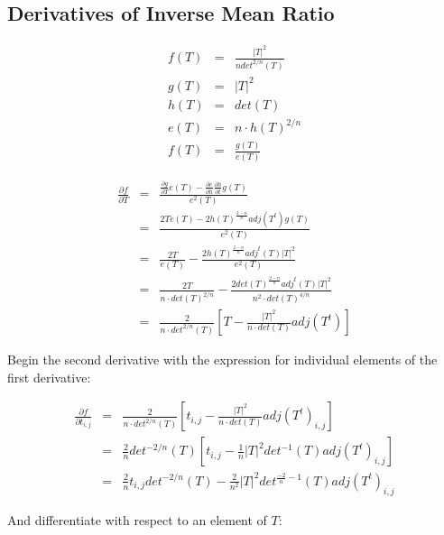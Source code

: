 \documentclass{report}
\begin{document}
\subsection{Derivatives of Inverse Mean Ratio}

\begin{eqnarray}
f(T) & = & \frac{|T|^2}{n det^{2/n}(T)} \\
g(T) & = & |T|^2 \\
h(T) & = & det(T) \\
e(T) & = & n \cdot h(T)^{2/n} \\
f(T) & = & \frac{g(T)}{e(T)} 
\end{eqnarray}

\begin{eqnarray}
\frac{\partial f}{\partial T} &=& \frac{
\frac{\partial g}{\partial T} e(T) - 
\frac{\partial e}{\partial h} \frac{\partial h}{\partial t} g(T)}
{e^2(T)} \\
&=& 
\frac{2 T e(T) - 
2 h(T)^\frac{2-n}{n} adj(T^t) g(T)}
{e^2(T)} \\
& = &  
\frac{2 T}{e(T)} -
\frac{2 h(T)^{\frac{2-n}{n}} adj^t(T) |T|^2}{e^2(T)} \\
& = &  
\frac{2 T}{n \cdot det(T)^{2/n}} -
\frac{2 det(T)^{\frac{2-n}{n}} adj^t(T) |T|^2}{n^2 \cdot det(T)^{4/n}} \\
& = &  
\frac{2}{n \cdot det^{2/n}(T)}\left[ T - \frac{|T|^2}{n \cdot det(T)} adj(T^t) \right]
\end{eqnarray}

\noindent Begin the second derivative with the  expression for individual elements of the first derivative:

\begin{eqnarray}
\frac{\partial f}{\partial t_{i,j}} & = & 
\frac{2}{n \cdot det^{2/n}(T)}\left[ t_{i,j} - \frac{|T|^2}{n \cdot det(T)} adj(T^t)_{i,j} \right] \\
 & = & 
\frac{2}{n}det^{-2/n}(T)\left[ t_{i,j} - \frac{1}{n}|T|^2 det^{-1}(T) adj(T^t)_{i,j}\right] \\
 & = &
\frac{2}{n} t_{i,j} det^{-2/n}(T) - \frac{2}{n^2} |T|^2 det^{\frac{-2}{n} - 1}(T) adj(T^t)_{i,j} 
\end{eqnarray}

\noindent And differentiate with respect to an element of $T$:
\end{document}
